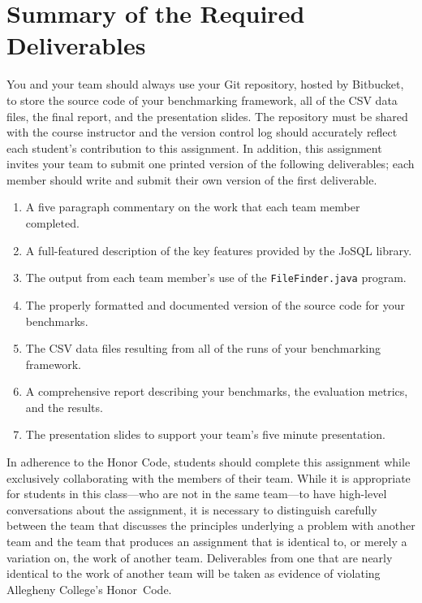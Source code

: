 \section*{Summary of the Required Deliverables}

You and your team should always use your Git repository, hosted by Bitbucket, to store the source code of your
benchmarking framework, all of the CSV data files, the final report, and the presentation slides. The repository must be
shared with the course instructor and the version control log should accurately reflect each student's contribution to
this assignment. In addition, this assignment invites your team to submit one printed version of the following
deliverables; each member should write and submit their own version of the first deliverable. 


\begin{enumerate}
  \item A five paragraph commentary on the work that each team member completed. 
  \item A full-featured description of the key features provided by the JoSQL library.
  \item The output from each team member's use of the {\tt FileFinder.java} program.
  \item The properly formatted and documented version of the source code for your benchmarks.
  \item The CSV data files resulting from all of the runs of your benchmarking framework.
  \item A comprehensive report describing your benchmarks, the evaluation metrics, and the results.
    \item The presentation slides to support your team's five minute presentation.
\end{enumerate}


In adherence to the Honor Code, students should complete this assignment while exclusively collaborating with the
members of their team. While it is appropriate for students in this class---who are not in the same team---to have
high-level conversations about the assignment, it is necessary to distinguish carefully between the team that discusses
the principles underlying a problem with another team and the team that produces an assignment that is identical to, or
merely a variation on, the work of another team.  Deliverables from one that are nearly identical to the work of another
team will be taken as evidence of violating Allegheny College's \mbox{Honor Code}.






